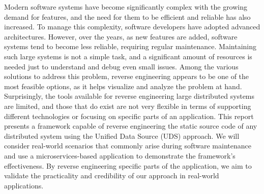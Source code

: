 
Modern software systems have become significantly complex with the growing demand for features, and the need for them to be efficient and reliable has also increased. To manage this complexity, software developers have adopted advanced architectures. However, over the years, as new features are added, software systems tend to become less reliable, requiring regular maintenance. Maintaining such large systems is not a simple task, and a significant amount of resources is needed just to understand and debug even small issues. Among the various solutions to address this problem, reverse engineering appears to be one of the most feasible options, as it helps visualize and analyze the problem at hand. Surprisingly, the tools available for reverse engineering large distributed systems are limited, and those that do exist are not very flexible in terms of supporting different technologies or focusing on specific parts of an application. This report presents a framework capable of reverse engineering the static source code of any distributed system using the Unified Data Source (UDS) approach. We will consider real-world scenarios that commonly arise during software maintenance and use a microservices-based application to demonstrate the framework's effectiveness. By reverse engineering specific parts of the application, we aim to validate the practicality and credibility of our approach in real-world applications.